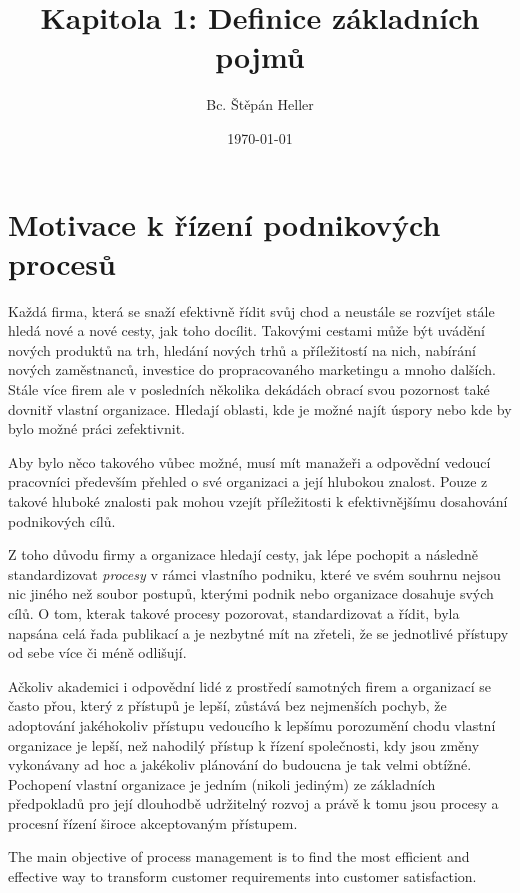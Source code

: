 \documentclass[]{article}
\begin{document}
\title{Kapitola 1: Definice základních pojmů}
\author{Bc. Štěpán Heller}
\date{\today}
\maketitle

\section{Motivace k řízení podnikových procesů}
Každá firma, která se snaží efektivně řídit svůj chod a neustále se rozvíjet stále hledá nové a nové cesty, jak toho docílit. Takovými cestami může být uvádění nových produktů na trh, hledání nových trhů a příležitostí na nich, nabírání nových zaměstnanců, investice do propracovaného marketingu a mnoho dalších. Stále více firem ale v posledních několika dekádách obrací svou pozornost také dovnitř vlastní organizace. Hledají oblasti, kde je možné najít úspory nebo kde by bylo možné práci zefektivnit.

Aby bylo něco takového vůbec možné, musí mít manažeři a odpovědní vedoucí pracovníci především přehled o své organizaci a její hlubokou znalost. Pouze z takové hluboké znalosti pak mohou vzejít příležitosti k efektivnějšímu dosahování podnikových cílů.

Z toho důvodu firmy a organizace hledají cesty, jak lépe pochopit a následně standardizovat \textit{procesy} v rámci vlastního podniku, které ve svém souhrnu nejsou nic jiného než soubor postupů, kterými podnik nebo organizace dosahuje svých cílů. O tom, kterak takové procesy pozorovat, standardizovat a řídit, byla napsána celá řada publikací a je nezbytné mít na zřeteli, že se jednotlivé přístupy od sebe více či méně odlišují. 

Ačkoliv akademici i odpovědní lidé z prostředí samotných firem a organizací se často přou, který z přístupů je lepší, zůstává bez nejmenších pochyb, že adoptování jakéhokoliv přístupu vedoucího k lepšímu porozumění chodu vlastní organizace je lepší, než nahodilý přístup k řízení společnosti, kdy jsou změny vykonávany ad hoc a jakékoliv plánování do budoucna je tak velmi obtížné. Pochopení vlastní organizace je jedním (nikoli jediným) ze základních předpokladů pro její dlouhodbě udržitelný rozvoj a právě k tomu jsou procesy a procesní řízení široce akceptovaným přístupem.

The main objective of process management is to find the most efficient and effective way to transform customer requirements into customer satisfaction.
\end{document}
